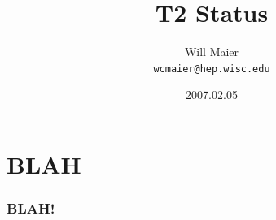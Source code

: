 \documentclass{beamer}
\title{T2 Status}
\author[Will Maier]{Will Maier \\ \texttt{wcmaier@hep.wisc.edu}}
\institute[Wisconsin]{University of Wisconsin - High Energy Physics}
\date{2007.02.05}
\begin{document}


\section{BLAH}
\begin{frame}
    \frametitle{BLAH!}
\end{frame}
\end{document}
